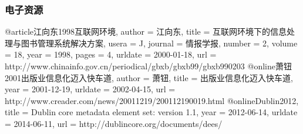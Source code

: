 \subsubsection{电子资源}

\begin{latexexample}
  @article{江向东1998互联网环境,
    author          = {江向东},
    title           = {互联网环境下的信息处理与图书管理系统解决方案},
    usera           = {J},
    journal         = {情报学报},
    number          = {2},
    volume          = {18},
    year            = {1998},
    pages           = {4},
    urldate         = {2000-01-18},
    url             = {http://www.chinainfo.gov.cn/periodical/gbxb/gbxb99/gbxb990203}
  }
  @online{萧钮2001出版业信息化迈入快车道,
    author          = {萧钮},
    title           = {出版业信息化迈入快车道},
    year            = {2001-12-19},
    urldate         = {2002-04-15},
    url             = {http://www.creader.com/news/20011219/200112190019.html}
  }
  @online{Dublin2012,
    title           = {Dublin core metadata element set: version 1.1},
    year            = {2012-06-14},
    urldate         = {2014-06-11},
    url             = {http://dublincore.org/documents/dees/}
  }
\end{latexexample}